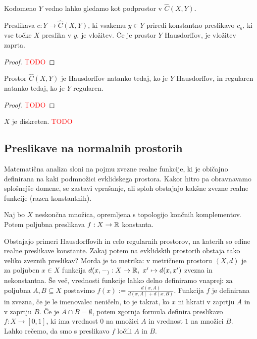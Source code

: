 Kodomeno $Y$ vedno lahko gledamo kot podprostor v $\widehat{C}(X,Y)$.
\begin{trditev}
    Preslikava $c: Y \to \widehat{C}(X,Y)$, ki vsakemu $y \in Y$ priredi konstantno preslikavo $c_y$, ki vse točke $X$ preslika v $y$, je vložitev. Če je prostor $Y$ Hausdorffov, je vložitev zaprta.
\end{trditev}

\begin{proof}
    \textcolor{red}{TODO}
\end{proof}

\begin{trditev}
    Prostor $\widehat{C}(X,Y)$ je Hausdorffov natanko tedaj, ko je $Y$ Hausdorffov, in regularen natanko tedaj, ko je $Y$ regularen.
\end{trditev}

\begin{proof}
    \textcolor{red}{TODO}
\end{proof}

\begin{primer}
    $X$ je diskreten. \textcolor{red}{TODO}
\end{primer}

\subsection{Preslikave na normalnih prostorih}
Matematična analiza sloni na pojmu zvezne realne funkcije, ki je običajno definirana na kaki podmnožici evklidskega prostora. Kakor hitro pa obravnavamo splošnejše domene, se zastavi vprašanje, ali sploh obstajajo kakšne zvezne realne funkcije (razen konstantnih).
\begin{primer}
    Naj bo $X$ neskončna množica, opremljena s topologijo končnih komplementov. Potem poljubna preslikava $f:  X \to \mathbb{R}$ konstanta.
\end{primer}
Obstajajo primeri Hausdorffovih in celo regularnih prostorov, na katerih so edine realne preslikave konstante. Zakaj potem na evklidskih prostorih obstaja tako veliko zveznih preslikav? Morda je to metrika: v metričnem prostoru $(X,d)$ je za poljuben $x \in X$ funkcija $d(x,-_): X \to \mathbb{R}, \ x' \mapsto d(x, x')$ zvezna in nekonstantna. Še več, vrednosti funkcije lahko delno definiramo vnaprej: za poljubna $A, B \subseteq X$ postavimo $f(x) := \frac{d(x, A)}{d(x, A) + d(x, B)}$. Funkcija $f$ je definirana in zvezna, če je le imenovalec neničeln, to je takrat, ko $x$ ni hkrati v zaprtju $A$ in v zaprtju $B$. Če je $\overline{A} \cap \overline{B} = \emptyset$, potem zgornja formula definira preslikavo $f: X \to [0,1]$, ki ima vrednost $0$ na množici $A$ in vrednost $1$ na množici $B$. Lahko rečemo, da smo s preslikavo $f$ ločili $A$ in $B$.

